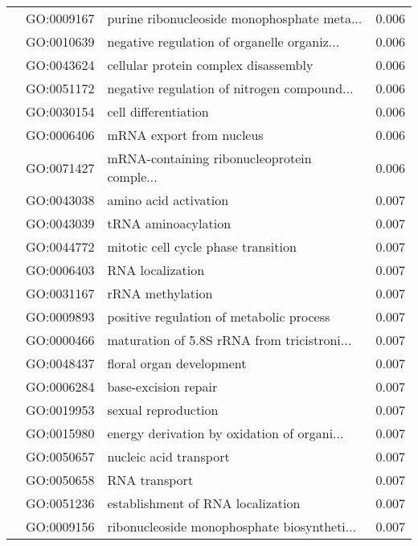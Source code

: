 \begin{longtable}{lllr}
   & GO:0009167 &  purine ribonucleoside monophosphate meta... &         0.006 \\
   & GO:0010639 &  negative regulation of organelle organiz... &         0.006 \\
   & GO:0043624 &         cellular protein complex disassembly &         0.006 \\
   & GO:0051172 &  negative regulation of nitrogen compound... &         0.006 \\
   & GO:0030154 &                         cell differentiation &         0.006 \\
   & GO:0006406 &                     mRNA export from nucleus &         0.006 \\
   & GO:0071427 &  mRNA-containing ribonucleoprotein comple... &         0.006 \\
   & GO:0043038 &                        amino acid activation &         0.007 \\
   & GO:0043039 &                          tRNA aminoacylation &         0.007 \\
   & GO:0044772 &          mitotic cell cycle phase transition &         0.007 \\
   & GO:0006403 &                             RNA localization &         0.007 \\
   & GO:0031167 &                             rRNA methylation &         0.007 \\
   & GO:0009893 &     positive regulation of metabolic process &         0.007 \\
   & GO:0000466 &  maturation of 5.8S rRNA from tricistroni... &         0.007 \\
   & GO:0048437 &                     floral organ development &         0.007 \\
   & GO:0006284 &                         base-excision repair &         0.007 \\
   & GO:0019953 &                          sexual reproduction &         0.007 \\
   & GO:0015980 &  energy derivation by oxidation of organi... &         0.007 \\
   & GO:0050657 &                       nucleic acid transport &         0.007 \\
   & GO:0050658 &                                RNA transport &         0.007 \\
   & GO:0051236 &            establishment of RNA localization &         0.007 \\
   & GO:0009156 &  ribonucleoside monophosphate biosyntheti... &         0.007 \\

\end{longtable}
